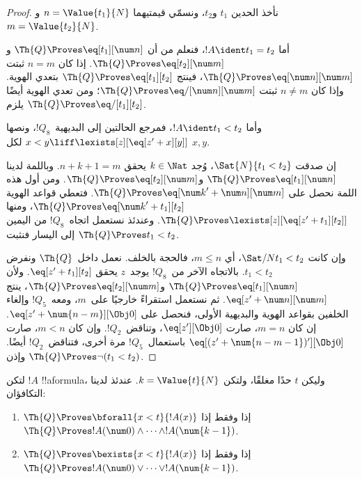 \documentclass[../../../include/open-logic-section]{subfiles}
\begin{document}
\begin{proof}
نأخذ الحدين $t_1$ و$t_2$، ونسمّي قيمتيهما
$n=\Value{t_1}{N}$ و$m=\Value{t_2}{N}$.

أما $!A\ident t_1=t_2$، فنعلم من
 أن
$\Th{Q}\Proves\eq[t_1][\num n]$
و$\Th{Q}\Proves\eq[t_2][\num m]$.
إذا كان $n=m$ ثبتت $\Th{Q}\Proves\eq[\num n][\num m]$،
فينتج $\Th{Q}\Proves\eq[t_1][t_2]$ بتعدي الهوية.
وإذا كان $n\neq m$ ثبتت
$\Th{Q}\Proves\eq/[\num n][\num m]$؛
ومن تعدي الهوية أيضًا يلزم $\Th{Q}\Proves\eq/[t_1][t_2]$.

وأما $!A\ident t_1<t_2$، فمرجع الحالتين إلى
البديهية~$!Q_8$، ونصها
$x<y\liff\lexists[z][\eq[z'+x][y]]$ لكل $x,y$.

إن صدقت $\Sat{N}{t_1<t_2}$، وُجد $k\in\Nat$
يحقق $n+k+1=m$. وباللمة  لدينا
$\Th{Q}\Proves\eq[t_1][\num n]$
و$\Th{Q}\Proves\eq[t_2][\num m]$.
ومن أول هذه اللمة نحصل على
$\Th{Q}\Proves\eq[{\num k}'+\num n][\num m]$.
فتعطي قواعد الهوية
$\Th{Q}\Proves\eq[{\num k}'+t_1][t_2]$،
ومنها $\Th{Q}\Proves\lexists[z][\eq[z'+t_1][t_2]]$.
وعندئذ نستعمل اتجاه~$!Q_8$ من اليمين إلى اليسار فنثبت
$\Th{Q}\Proves t_1<t_2$.

وإن كانت $\Sat/{N}{t_1<t_2}$، أي $m\leq n$، فالحجة بالخلف.
%
نعمل داخل~$\Th{Q}$ ونفرض $t_1<t_2$.
بالاتجاه الآخر من~$!Q_8$ يوجد~$z$ يحقق $\eq[z'+t_1][t_2]$.
ولأن $\Th{Q}\Proves\eq[t_1][\num n]$
و$\Th{Q}\Proves\eq[t_2][\num m]$، ينتج
$\eq[z'+\num n][\num m]$.
%
ثم نستعمل استقراءً خارجيًا على~$m$، ومعه~$!Q_5$ وإلغاء الخلفين بقواعد
الهوية والبديهية الأولى، فنحصل على
$\eq[z'+\num{n-m}][\Obj 0]$.
إن كان $m=n$، صارت $\eq[z'][\Obj 0]$، وتناقض~$!Q_2$.
وإن كان $m<n$، صارت
$\eq[(z'+\num{n-m-1})'][\Obj 0]$ باستعمال~$!Q_5$ مرة أخرى،
فتناقض~$!Q_2$ أيضًا. وإذن $\Th{Q}\Proves\lnot(t_1<t_2)$.
\end{proof}

\begin{lem}
لتكن $!A$ !!a{formula}، وليكن $t$ حدًا مغلقًا،
ولتكن $k=\Value{t}{N}$. عندئذ لدينا التكافؤان:
\begin{enumerate}
\item $\Th{Q}\Proves\bforall{x<t}{!A(x)}$ إذا وفقط إذا
    $\Th{Q}\Proves !A(\num 0)\land\dots\land !A(\num{k-1})$.
\item $\Th{Q}\Proves\bexists{x<t}{!A(x)}$ إذا وفقط إذا
    $\Th{Q}\Proves !A(\num 0)\lor\dots\lor !A(\num{k-1})$.
\end{enumerate}
\end{lem}
\end{document}
